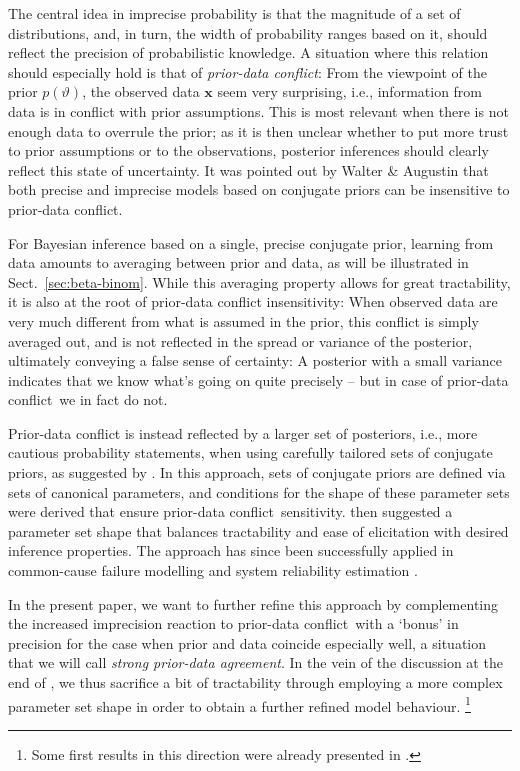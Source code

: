 \documentclass[runningheads,a4paper]{llncs}
\def\pdc{prior-data conflict}
\renewcommand{\vec}[1]{{\bm #1}}
\begin{document}
The central idea in imprecise probability is that the magnitude of a set of distributions,
and, in turn, the width of probability ranges based on it,
should reflect the precision of probabilistic knowledge.
A situation where this relation should especially hold is that of \emph{\pdc}:
From the viewpoint of the prior $p(\vartheta)$, the observed data $\vec{x}$ seem very surprising,
i.e., information from data is in conflict with prior assumptions.
This is most relevant when there is not enough data to overrule the prior;
as it is then unclear whether to put more trust to prior assumptions or to the observations,
posterior inferences should clearly reflect this state of uncertainty.
It was pointed out by Walter \& Augustin \cite{Walter2009a} that
both precise and imprecise models based on conjugate priors can be insensitive to prior-data conflict.

For Bayesian inference based on a single, precise conjugate prior,
learning from data amounts to averaging between prior and data,
as will be illustrated in Sect.~\ref{sec:beta-binom}.
While this averaging property allows for great tractability,
it is also at the root of prior-data conflict insensitivity: 
When observed data are very much different from what is assumed in the prior,
this conflict is simply averaged out,
and is not reflected in the spread or variance of the posterior,
ultimately conveying a false sense of certainty:
A posterior with a small variance indicates that we know what's going on quite precisely -- but in case of \pdc\ we in fact do not.

Prior-data conflict is instead reflected by a larger set of posteriors,
i.e., more cautious probability statements,
when using carefully tailored sets of conjugate priors,
as suggested by \cite{Walter2009a}.
In this approach, sets of conjugate priors are defined via sets of canonical parameters,
and conditions for the shape of these parameter sets were derived that ensure \pdc\ sensitivity.
\cite{Walter2009a} then suggested a parameter set shape
that balances tractability and ease of elicitation
with desired inference properties.
The approach has since been successfully applied in common-cause failure modelling \cite{Troffaes2014a}
and system reliability estimation \cite{2015:walter}.

In the present paper, we want to further refine this approach
by complementing the increased imprecision reaction to \pdc\
with a `bonus' in precision for the case when prior and data coincide especially well,
a situation that we will call \emph{strong prior-data agreement}.
In the vein of the discussion at the end of \cite[\S~3.1.4]{2013:diss-gw},
we thus sacrifice a bit of tractability through employing a more complex parameter set shape
in order to obtain a further refined model behaviour.%
\footnote{Some first results in this direction were already presented in \cite[\S~A.2]{2013:diss-gw}.}
\end{document}
